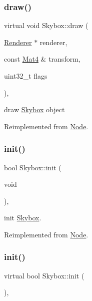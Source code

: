 \subsubsection{\texorpdfstring{draw()}{draw()}\hspace{0.1cm}{\footnotesize\ttfamily [2/2]}}
{\footnotesize\ttfamily virtual void Skybox\+::draw (\begin{DoxyParamCaption}\item[{\hyperlink{classRenderer}{Renderer} $\ast$}]{renderer,  }\item[{const \hyperlink{classMat4}{Mat4} \&}]{transform,  }\item[{uint32\+\_\+t}]{flags }\end{DoxyParamCaption})\hspace{0.3cm}{\ttfamily [override]}, {\ttfamily [virtual]}}

draw \hyperlink{classSkybox}{Skybox} object 

Reimplemented from \hyperlink{classNode_abcf85087a15901deb7c6c1231634c8ab}{Node}.

\mbox{\label{classSkybox_a85612eb2cee2df59fdc97476317c347b}} 
\subsubsection{\texorpdfstring{init()}{init()}\hspace{0.1cm}{\footnotesize\ttfamily [1/4]}}
{\footnotesize\ttfamily bool Skybox\+::init (\begin{DoxyParamCaption}\item[{void}]{ }\end{DoxyParamCaption})\hspace{0.3cm}{\ttfamily [override]}, {\ttfamily [virtual]}}

init \hyperlink{classSkybox}{Skybox}. 

Reimplemented from \hyperlink{classNode}{Node}.

\mbox{\label{classSkybox_a0543d3957718514e374cc351dad5315e}} 
\subsubsection{\texorpdfstring{init()}{init()}\hspace{0.1cm}{\footnotesize\ttfamily [2/4]}}
{\footnotesize\ttfamily virtual bool Skybox\+::init (\begin{DoxyParamCaption}{ }\end{DoxyParamCaption})\hspace{0.3cm}{\ttfamily [override]}, {\ttfamily [virtual]}}


